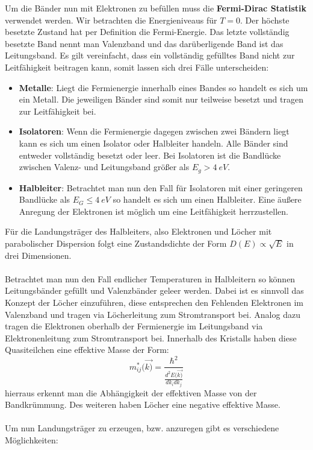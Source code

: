 Um die Bänder nun mit Elektronen zu befüllen muss die \textbf{Fermi-Dirac Statistik} verwendet werden. Wir betrachten die Energieniveaus für $ T = 0$. Der höchste besetzte Zustand hat per Definition die Fermi-Energie. Das letzte vollständig besetzte Band nennt man Valenzband und das darüberligende Band ist das Leitungsband. Es gilt vereinfacht, dass ein vollständig gefülltes Band nicht zur Leitfähigkeit beitragen kann, somit lassen sich drei Fälle unterscheiden:
\begin{itemize}
    \item \textbf{Metalle}: Liegt die Fermienergie innerhalb eines Bandes so handelt es sich um ein Metall. Die jeweiligen Bänder sind somit nur teilweise besetzt und tragen zur Leitfähigkeit bei. \\
    \item \textbf{Isolatoren}: Wenn die Fermienergie dagegen zwischen zwei Bändern liegt kann es sich um einen Isolator oder Halbleiter handeln. Alle Bänder sind entweder vollständig besetzt oder leer. Bei Isolatoren ist die Bandlücke zwischen Valenz- und Leitungsband größer als $E_g > \SI{4}{eV}$. \\
    \item \textbf{Halbleiter}: Betrachtet man nun den Fall für Isolatoren mit einer geringeren Bandlücke als $E_G \leq \SI{4}{eV} $ so handelt es sich um einen Halbleiter. Eine äußere Anregung der Elektronen ist möglich um eine Leitfähigkeit herrzustellen.\\
\end{itemize}

Für die Landungsträger des Halbleiters, also Elektronen und Löcher mit parabolischer Dispersion folgt eine Zustandsdichte der Form $ D(E) \propto \sqrt{E}$ in drei Dimensionen.
\\
\\
Betrachtet man nun den Fall endlicher Temperaturen in Halbleitern so können Leitungsbänder gefüllt und Valenzbänder geleer werden. Dabei ist es sinnvoll das Konzept der Löcher einzuführen, diese entsprechen den Fehlenden Elektronen im Valenzband und tragen via Löcherleitung zum Stromtransport bei. Analog dazu tragen die Elektronen oberhalb der Fermienergie im Leitungsband via Elektronenleitung zum Stromtransport bei. Innerhalb des Kristalls haben diese Quasiteilchen eine effektive Masse der Form:
\begin{equation}
    m^*_{ij}(\Vec{k)} = \frac{\hbar^2}{\frac{d^2E(\Vec{k)}}{dk_i dk_j}}
\end{equation}
hierraus erkennt man die Abhängigkeit der effektiven Masse von der Bandkrümmung. Des weiteren haben Löcher eine negative effektive Masse. \\
\\
Um nun Landungsträger zu erzeugen, bzw. anzuregen gibt es verschiedene Möglichkeiten:

